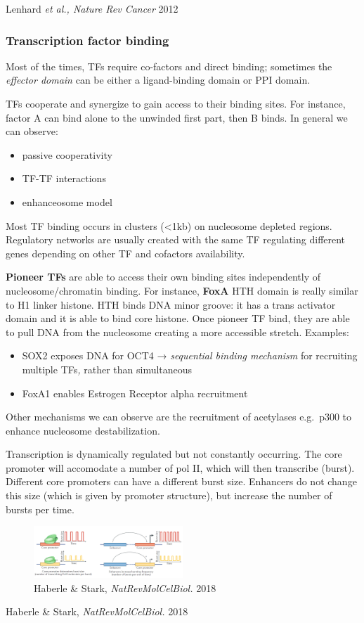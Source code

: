 Lenhard \emph{et al., Nature Rev Cancer} 2012

\hypertarget{transcription-factor-binding}{%
\subsubsection{Transcription factor binding}\label{transcription-factor-binding}}

Most of the times, TFs require co-factors and direct binding; sometimes the \emph{effector domain} can be either a ligand-binding domain or PPI domain.

TFs cooperate and synergize to gain access to their binding sites. For instance, factor A can bind alone to the unwinded first part, then B binds. In general we can observe:

\begin{itemize}
\tightlist
\item
  passive cooperativity
\item
  TF-TF interactions
\item
  enhanceosome model
\end{itemize}

Most TF binding occurs in clusters (\textless1kb) on nucleosome depleted regions. Regulatory networks are usually created with the same TF regulating different genes depending on other TF and cofactors availability.

\textbf{Pioneer TFs} are able to access their own binding sites independently of nucleosome/chromatin binding. For instance, \textbf{FoxA} HTH domain is really similar to H1 linker histone. HTH binds DNA minor groove: it has a trans activator domain and it is able to bind core histone. Once pioneer TF bind, they are able to pull DNA from the nucleosome creating a more accessible stretch. Examples:

\begin{itemize}
\tightlist
\item
  SOX2 exposes DNA for OCT4 → \emph{sequential binding mechanism} for recruiting multiple TFs\emph{,} rather than simultaneous
\item
  FoxA1 enables Estrogen Receptor alpha recruitment
\end{itemize}

Other mechanisms we can observe are the recruitment of acetylases e.g.~p300 to enhance nucleosome destabilization.

Transcription is dynamically regulated but not constantly occurring. The core promoter will accomodate a number of pol II, which will then transcribe (burst). Different core promoters can have a different burst size. Enhancers do not change this size (which is given by promoter structure), but increase the number of bursts per time.

\begin{figure}
\centering
\includegraphics[width=0.5\textwidth]{../_resources/Screenshot_2022-10-10_at_10-50-43.png}
\caption{Haberle \& Stark, \emph{NatRevMolCelBiol.} 2018}
\end{figure}

Haberle \& Stark, \emph{NatRevMolCelBiol.} 2018

